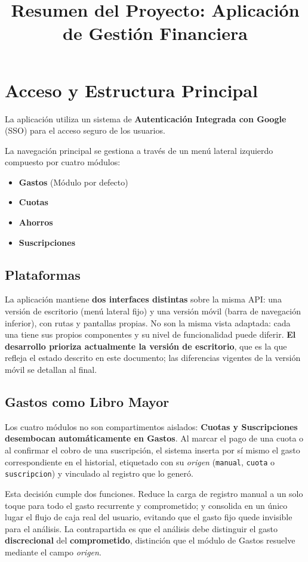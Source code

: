 \documentclass[12pt]{article}
\title{Resumen del Proyecto: Aplicación de Gestión Financiera}
\author{}
\date{}
\begin{document}
\maketitle

\section{Acceso y Estructura Principal}
La aplicación utiliza un sistema de \textbf{Autenticación Integrada con Google} (SSO) para el acceso seguro de los usuarios. 

La navegación principal se gestiona a través de un menú lateral izquierdo compuesto por cuatro módulos:
\begin{itemize}
    \item \textbf{Gastos} (Módulo por defecto)
    \item \textbf{Cuotas}
    \item \textbf{Ahorros}
    \item \textbf{Suscripciones}
\end{itemize}

\subsection{Plataformas}
La aplicación mantiene \textbf{dos interfaces distintas} sobre la misma API: una versión de escritorio (menú lateral fijo) y una versión móvil (barra de navegación inferior), con rutas y pantallas propias. No son la misma vista adaptada: cada una tiene sus propios componentes y su nivel de funcionalidad puede diferir. \textbf{El desarrollo prioriza actualmente la versión de escritorio}, que es la que refleja el estado descrito en este documento; las diferencias vigentes de la versión móvil se detallan al final.

\subsection{Gastos como Libro Mayor}
Los cuatro módulos no son compartimentos aislados: \textbf{Cuotas y Suscripciones desembocan automáticamente en Gastos}. Al marcar el pago de una cuota o al confirmar el cobro de una suscripción, el sistema inserta por sí mismo el gasto correspondiente en el historial, etiquetado con su \textit{origen} (\texttt{manual}, \texttt{cuota} o \texttt{suscripcion}) y vinculado al registro que lo generó.

Esta decisión cumple dos funciones. Reduce la carga de registro manual a un solo toque para todo el gasto recurrente y comprometido; y consolida en un único lugar el flujo de caja real del usuario, evitando que el gasto fijo quede invisible para el análisis. La contrapartida es que el análisis debe distinguir el gasto \textbf{discrecional} del \textbf{comprometido}, distinción que el módulo de Gastos resuelve mediante el campo \textit{origen}.
\end{document}
